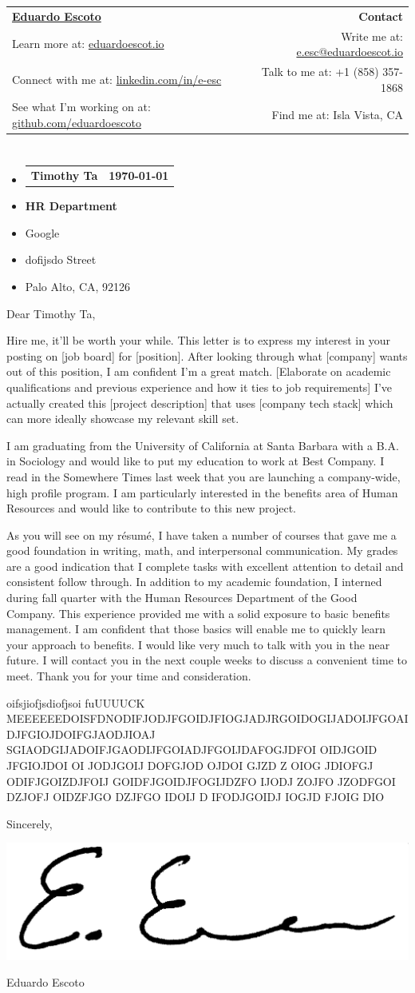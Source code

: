 \documentclass[letterpaper,11pt]{article}
\makeatletter
\newcommand{\CompanyName}{Google}
\newcommand{\Department}{HR Department}
\newcommand{\EmployerName}{Timothy Ta}
\newcommand{\CompanyAddress}{dofijsdo Street}
\newcommand{\CompanyCSZP}{Palo Alto, CA, 92126}
\newcommand{\Date}[1][\today]{#1}
\newcommand{\Name}{Eduardo Escoto}
\newcommand{\PersonalWebsite}{eduardoescot.io}
\newcommand{\LinkedIn}{linkedin.com/in/e-esc}
\newcommand{\Github}{github.com/eduardoescoto}
\newcommand{\PersonalEmail}{e.esc@eduardoescot.io}
\newcommand{\PhoneNumber}{+1 (858) 357-1868}
\newcommand{\Location}{Isla Vista, CA}
\newcommand{\Signature}{\includegraphics[height=2.2\baselineskip]{../assets/signature}}
\newcommand{\Header}{
  \begin{tabular*}{\textwidth}{l@{\extracolsep{\fill}}r}
  \textbf{\href{http://\PersonalWebsite}{\Huge{\Name}}} & \textbf{\LARGE Contact}\\
  Learn more at: \href{http://\PersonalWebsite}{\PersonalWebsite} & Write me at: \href{mailto:\PersonalEmail}{\PersonalEmail}\\
  Connect with me at: \href{https://\LinkedIn}{\LinkedIn} & Talk to me at: \PhoneNumber \\
  See what I'm working on at: \href{https://\Github}{\Github} & Find me at: \Location
  \end{tabular*}\vspace{-5pt}
  \section{}
}
\newcommand{\EmployerInformation}{
  \begin{itemize}[leftmargin=0pt]
    \item[]{
      \begin{tabular*}{\textwidth}[t]{l@{\extracolsep{\fill}}r}
      \large{{\textbf{\EmployerName}}} & \large{{\textbf{\Date}}}
    \end{tabular*}\vspace{-6pt}
    }
    \item[]{\large{\textbf{\Department}}}\vspace{-6pt}
    \item[]{\large{\CompanyName}}\vspace{-6pt}
    \item[]{\large{\CompanyAddress}}\vspace{-6pt}
    \item[]{\large{\CompanyCSZP}}\vspace{-6pt} 
  \end{itemize}
}
\newcommand{\Salutation}{
  \vspace{30pt}
  Dear \EmployerName{}, \par \bigskip
}
\newcommand{\CoverLetterParagraph}[1]{
  \par
  #1
  \bigskip
  }
\newcommand{\Closing}{
  \vspace{30pt}
  \par Sincerely, \bigskip
  \par \Signature \medskip
  \par \Name
  }
\makeatother
\begin{document}
\Header
\EmployerInformation

\Salutation

\CoverLetterParagraph{  
  Hire me, it'll be worth your while. This letter is to express my interest in your posting on [job board] for [position].
  After looking through what [company] wants out of this position, I am confident I'm a great match.
  [Elaborate on academic qualifications and previous experience and how it ties to job requirements]
  I've actually created this [project description] that uses [company tech stack] which can more ideally showcase my relevant skill set.
}
 
\CoverLetterParagraph{
  I am graduating from the University of California at Santa Barbara with a B.A. in Sociology
  and would like to put my education to work at Best Company. I read in the Somewhere Times
  last week that you are launching a company-wide, high profile program. I am particularly
  interested in the benefits area of Human Resources and would like to contribute to this new
  project.
}

\CoverLetterParagraph{
  As you will see on my résumé, I have taken a number of courses that gave me a good foundation in writing, math, and interpersonal communication. My grades are a good indication
  that I complete tasks with excellent attention to detail and consistent follow through. In addition to my academic foundation, I interned during fall quarter with the Human Resources
  Department of the Good Company. This experience provided me with a solid exposure to
  basic benefits management. I am confident that those basics will enable me to quickly learn
  your approach to benefits.
  I would like very much to talk with you in the near future. I will contact you in the next couple weeks to discuss a convenient time to meet. Thank you for your time and consideration.
}

\CoverLetterParagraph{
  oifsjiofjsdiofjsoi fuUUUUCK MEEEEEEDOISFDNODIFJODJFGOIDJFIOGJADJRGOIDOGIJADOIJFGOAIDJFGIOJDOIFGJAODJIOAJ
  SGIAODGIJADOIFJGAODIJFGOIADJFGOIJDAFOGJDFOI OIDJGOID JFGIOJDOI OI JODJGOIJ DOFGJOD OJDOI GJZD
  Z OIOG JDIOFGJ ODIFJGOIZDJFOIJ GOIDFJGOIDJFOGIJDZFO IJODJ ZOJFO JZODFGOI DZJOFJ OIDZFJGO DZJFGO IDOIJ D
   IFODJGOIDJ IOGJD FJOIG DIO
}

\Closing
\end{document}
